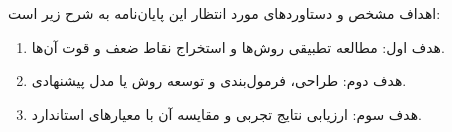 
اهداف مشخص و دستاوردهای مورد انتظار این پایان‌نامه به شرح زیر است:

\begin{enumerate}[label=\arabic*-, leftmargin=1.5cm]
    \item هدف اول: مطالعه تطبیقی روش‌ها و استخراج نقاط ضعف و قوت آن‌ها.
    \item هدف دوم: طراحی، فرمول‌بندی و توسعه روش یا مدل پیشنهادی.
    \item هدف سوم: ارزیابی نتایج تجربی و مقایسه آن با معیارهای استاندارد.
\end{enumerate}
